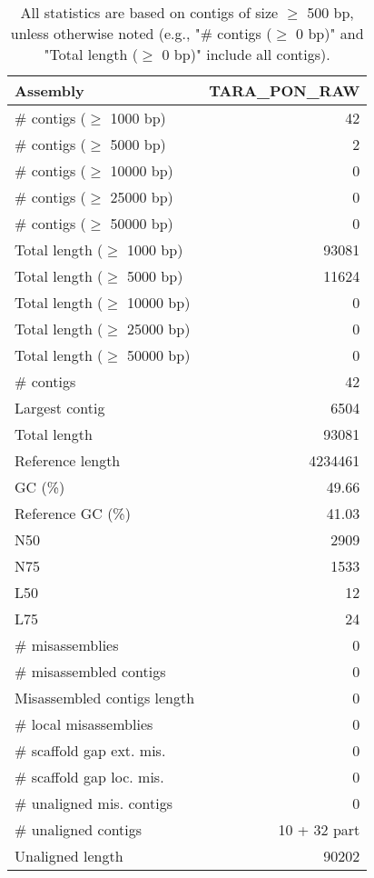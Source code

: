 \documentclass[12pt,a4paper]{article}
\begin{document}
\begin{table}[ht]
\begin{center}
\caption{All statistics are based on contigs of size $\geq$ 500 bp, unless otherwise noted (e.g., "\# contigs ($\geq$ 0 bp)" and "Total length ($\geq$ 0 bp)" include all contigs).}
\begin{tabular}{|l*{1}{|r}|}
\hline
Assembly & TARA\_PON\_RAW \\ \hline
\# contigs ($\geq$ 1000 bp) & 42 \\ \hline
\# contigs ($\geq$ 5000 bp) & 2 \\ \hline
\# contigs ($\geq$ 10000 bp) & 0 \\ \hline
\# contigs ($\geq$ 25000 bp) & 0 \\ \hline
\# contigs ($\geq$ 50000 bp) & 0 \\ \hline
Total length ($\geq$ 1000 bp) & 93081 \\ \hline
Total length ($\geq$ 5000 bp) & 11624 \\ \hline
Total length ($\geq$ 10000 bp) & 0 \\ \hline
Total length ($\geq$ 25000 bp) & 0 \\ \hline
Total length ($\geq$ 50000 bp) & 0 \\ \hline
\# contigs & 42 \\ \hline
Largest contig & 6504 \\ \hline
Total length & 93081 \\ \hline
Reference length & 4234461 \\ \hline
GC (\%) & 49.66 \\ \hline
Reference GC (\%) & 41.03 \\ \hline
N50 & 2909 \\ \hline
N75 & 1533 \\ \hline
L50 & 12 \\ \hline
L75 & 24 \\ \hline
\# misassemblies & 0 \\ \hline
\# misassembled contigs & 0 \\ \hline
Misassembled contigs length & 0 \\ \hline
\# local misassemblies & 0 \\ \hline
\# scaffold gap ext. mis. & 0 \\ \hline
\# scaffold gap loc. mis. & 0 \\ \hline
\# unaligned mis. contigs & 0 \\ \hline
\# unaligned contigs & 10 + 32 part \\ \hline
Unaligned length & 90202 \\ \hline

\end{tabular}
\end{center}
\end{table}
\end{document}
